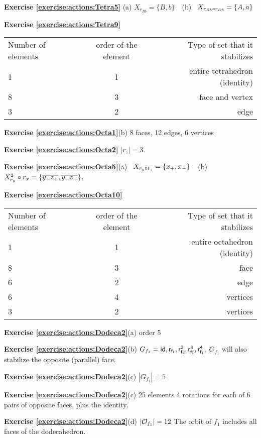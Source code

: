 \noindent\textbf{Exercise \ref{exercise:actions:Tetra5}}
(a) $X_{r_{Bb}}=\{B,b\}$~~(b)~ $X_{ r_{Bb}\circ r_{Db }}=\{A,a\}$

\noindent\textbf{Exercise \ref{exercise:actions:Tetra9}}

\begin{tabular}{ l c r }
Number of elements & order of the element & Type of set that it stabilizes \\
1 & 1 & entire tetrahedron (identity) \\
 8 & 3 & face and vertex \\
 3 & 2 & edge \\
\end{tabular}

\noindent\textbf{Exercise \ref{exercise:actions:Octa1}}(b)  8 faces, 12 edges, 6 vertices

\noindent\textbf{Exercise \ref{exercise:actions:Octa2}} $|r_z|=3$.

\noindent\textbf{Exercise \ref{exercise:actions:Octa5}}(a)~ $X_{r_{y}\circ r_{z}}=\{x_+,x_-\}$~~(b)
$X_{r_{y}}^2\circ r_{x}=\{\overline{y_+z_+},\overline{y_-z_-}\}$.

\noindent\textbf{Exercise \ref{exercise:actions:Octa10}}

\begin{tabular}{ l c r }
Number of elements & order of the element & Type of set that it stabilizes \\
1 & 1 & entire octahedron (identity) \\
8 & 3 & face  \\
6 & 2 & edge \\
6 & 4  & vertices\\
 3 & 2 &  vertices\\
\end{tabular}

\noindent\textbf{Exercise \ref{exercise:actions:Dodeca2}}(a)  order 5

\noindent\textbf{Exercise \ref{exercise:actions:Dodeca2}}(b) 
$G_{f_1}={\sf{id},r_{f_1},r_{f_1}^2, r_{f_1}^3, r_{f_1}^4}$, $G_{f_1}$ will also stabilize the opposite (parallel) face.

\noindent\textbf{Exercise \ref{exercise:actions:Dodeca2}}(c) 
 $|G_{f_1}|=5$

\noindent\textbf{Exercise \ref{exercise:actions:Dodeca2}}(c) 
25 elements 4 rotations for each of 6 pairs of opposite faces, plus the identity.

\noindent\textbf{Exercise \ref{exercise:actions:Dodeca2}}(d) 
$|{\cal O}_{f_1}|=12$ The orbit of $f_1$ includes all faces of the dodecahedron.

